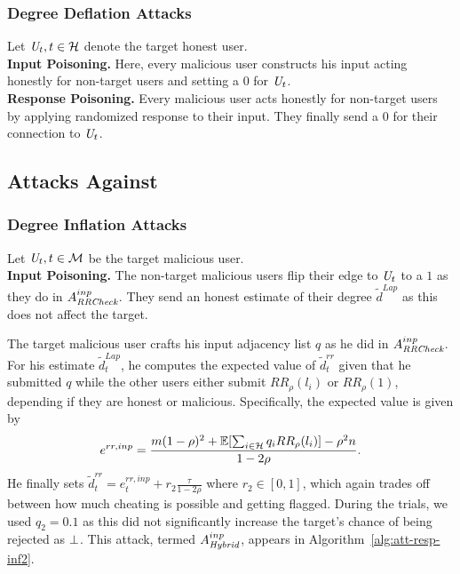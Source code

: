 \subsubsection{Degree Deflation Attacks}
Let $\textit{U}_t, t \in \mathcal{H}$ denote the target honest user. \\\noindent\textbf{Input Poisoning.} Here, every malicious user constructs his input acting honestly for non-target users and setting a $0$ for $\textit{U}_t$.
\\\noindent\textbf{Response Poisoning.} 
Every malicious user acts honestly for non-target users by applying randomized response to their input. They finally send a $0$ for their connection to $\textit{U}_t$.
\subsection{Attacks Against \DegHybrid{}}

\subsubsection{Degree Inflation Attacks}
Let $\textit{U}_t, t \in \mathcal{M}$ be the target malicious user.
\\
\noindent\textbf{Input Poisoning.} The non-target malicious users flip their edge to $\textit{U}_t$ to a $1$ as they do in $A_{\textit{RRCheck}{}}^{inp}$. They send an honest estimate of their degree $\tilde{d}^{Lap}$ as this does not affect the target.

The target malicious user crafts his input adjacency list $q$ as he did in $A_{\textit{RRCheck}}^{inp}$. For his estimate $\tilde{d}_t^{Lap}$, he 
computes the expected value of $\tilde{d}_t^{rr}$ given that he submitted $q$ while the other users either submit $RR_\rho(l_i)$ or $RR_\rho(1)$, depending if they are honest or malicious. Specifically, the expected value is given by
\[
    e^{rr,inp} = \frac{m(1-\rho)^2 + \operatorname{\mathbb{E}}[\sum_{i \in \mathcal{H}} q_i RR_\rho(l_i)] - \rho^2 n}{1-2\rho}.
\]
He finally sets $\tilde{d}_t^{rr} = e_t^{rr,inp} + r_2 \frac{\tau}{1-2\rho}$ where $r_2 \in [0,1]$, which again trades off between how much cheating is possible and getting flagged. During the trials, we used $q_2 = 0.1$ as this did not significantly increase the target's chance of being rejected as $\perp$. This attack, termed $A_{\textit{Hybrid}}^{inp}$, appears in Algorithm~\ref{alg:att-resp-inf2}.

